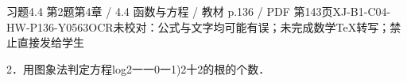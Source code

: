 \begin{bankitem}{习题4.4 第2题}{第4章 / 4.4 函数与方程 / 教材 p.136 / PDF 第143页}{XJ-B1-C04-HW-P136-Y0563}{OCR未校对：公式与文字均可能有误；未完成数学TeX转写；禁止直接发给学生}
\begin{ocrdraft}
\par
2．用图象法判定方程log2一一0一1)2十2的根的个数．
\end{ocrdraft}
\end{bankitem}
